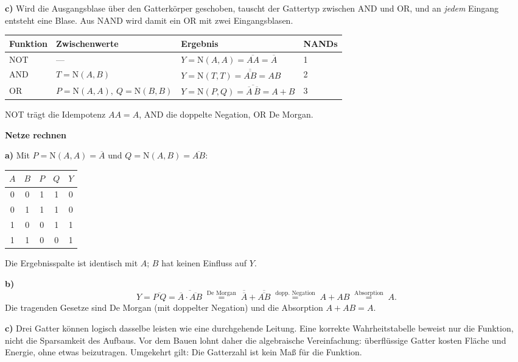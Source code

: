 \documentclass[10pt,a4paper]{article}
\newcommand{\titlepagepart}[2]{\vspace*{-4mm}{\sffamily\small #1}\par{\sffamily\LARGE\bfseries #2}\par\vspace{2mm}}
\newcommand{\block}[1]{\par\vspace{2mm}{\sffamily\large\bfseries #1}\par}
\newcommand{\N}{\mathrm{N}}
\begin{document}
\textbf{c)} Wird die Ausgangsblase über den Gatterkörper geschoben, tauscht der
Gattertyp zwischen AND und OR, und an \emph{jedem} Eingang entsteht eine Blase.
Aus NAND wird damit ein OR mit zwei Eingangsblasen.

\block{3. Die NAND-Aufbauten als Gleichung}
\begin{center}
\begin{tabular}{llll}\toprule
Funktion&Zwischenwerte&Ergebnis&NANDs\\\midrule
NOT&---&$Y=\N(A,A)=\overline{AA}=\overline{A}$&1\\
AND&$T=\N(A,B)$&$Y=\N(T,T)=\overline{\overline{AB}}=AB$&2\\
OR&$P=\N(A,A),\ Q=\N(B,B)$&$Y=\N(P,Q)=\overline{\overline{A}\,\overline{B}}=A+B$&3\\\bottomrule
\end{tabular}
\end{center}
NOT trägt die Idempotenz $AA=A$, AND die doppelte Negation, OR De Morgan.

\newpage
\titlepagepart{02 / LÖSUNGEN ZU SEITE 3}{Netze rechnen}

\block{4. Ein unbekanntes Netz bestimmen}
\textbf{a)} Mit $P=\N(A,A)=\overline{A}$ und $Q=\N(A,B)=\overline{AB}$:
\begin{center}
\begin{tabular}{cc|ccc}\toprule
$A$&$B$&$P$&$Q$&$Y$\\\midrule
0&0&1&1&0\\
0&1&1&1&0\\
1&0&0&1&1\\
1&1&0&0&1\\\bottomrule
\end{tabular}
\end{center}
Die Ergebnisspalte ist identisch mit $A$; $B$ hat keinen Einfluss auf $Y$.

\textbf{b)}
\[
Y=\overline{P\,Q}=\overline{\overline{A}\cdot\overline{AB}}
\;\overset{\text{De Morgan}}{=}\;\overline{\overline{A}}+\overline{\overline{AB}}
\;\overset{\text{dopp. Negation}}{=}\;A+AB
\;\overset{\text{Absorption}}{=}\;A .
\]
Die tragenden Gesetze sind De Morgan (mit doppelter Negation) und die
Absorption $A+AB=A$.

\textbf{c)} Drei Gatter können logisch dasselbe leisten wie eine durchgehende
Leitung. Eine korrekte Wahrheitstabelle beweist nur die Funktion, nicht die
Sparsamkeit des Aufbaus. Vor dem Bauen lohnt daher die algebraische
Vereinfachung: überflüssige Gatter kosten Fläche und Energie, ohne etwas
beizutragen. Umgekehrt gilt: Die Gatterzahl ist kein Maß für die Funktion.
\end{document}
